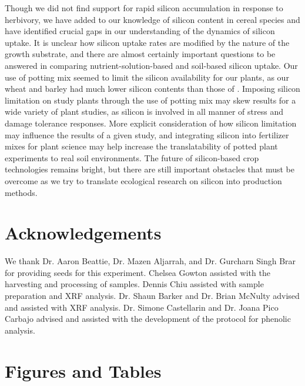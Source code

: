 \documentclass[12pt, letterpaper]{report}
\begin{document}
Though we did not find support for rapid silicon accumulation in response to herbivory, we have added to our knowledge of silicon content in cereal species and have identified crucial gaps in our understanding of the dynamics of silicon uptake. It is unclear how silicon uptake rates are modified by the nature of the growth substrate, and there are almost certainly important questions to be answered in comparing nutrient-solution-based and soil-based silicon uptake. Our use of potting mix seemed to limit the silicon availability for our plants, as our wheat and barley had much lower silicon contents than those of \textcite{simpson_still_2017}. Imposing silicon limitation on study plants through the use of potting mix may skew results for a wide variety of plant studies, as silicon is involved in all manner of stress and damage tolerance responses. More explicit consideration of how silicon limitation may influence the results of a given study, and integrating silicon into fertilizer mixes for plant science may help increase the translatability of potted plant experiments to real soil environments. The future of silicon-based crop technologies remains bright, but there are still important obstacles that must be overcome as we try to translate ecological research on silicon into production methods.

\section{Acknowledgements}

We thank Dr. Aaron Beattie, Dr. Mazen Aljarrah, and Dr. Gurcharn Singh Brar for providing seeds for this experiment. Chelsea Gowton assisted with the harvesting and processing of samples. Dennis Chiu assisted with sample preparation and XRF analysis. Dr. Shaun Barker and Dr. Brian McNulty advised and assisted with XRF analysis. Dr. Simone Castellarin and Dr. Joana Pico Carbajo advised and assisted with the development of the protocol for phenolic analysis. 


\clearpage

\section{Figures and Tables}
\end{document}
